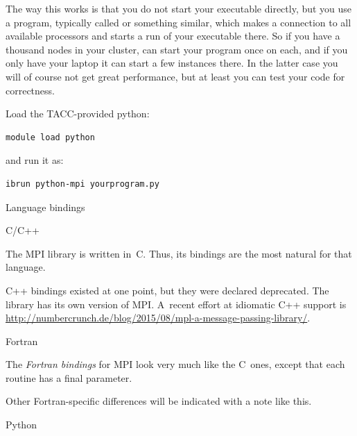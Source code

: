 The way this works is that you do not start your executable directly,
but you use a program, typically called  or
something similar, which makes a connection to all available
processors and starts a run of your executable there. So if you have a
thousand nodes in your cluster,  can start your program once
on each, and if you only have your laptop it can start a few instances
there. In the latter case you will of course not get great
performance, but at least you can test your code for correctness.

\begin{tacc}
  \begin{pythonnote}
    Load the TACC-provided python:
\begin{verbatim}
module load python
\end{verbatim}
and run it as:
\begin{verbatim}
ibrun python-mpi yourprogram.py
\end{verbatim}
  \end{pythonnote}
\end{tacc}

 {Language bindings}

 {C/C++}

The MPI library is written in~C. Thus, its bindings are the most natural
for that language.

C++ bindings existed at one point, but they were declared deprecated.
The  library has its own version of MPI.  A~recent
effort at idiomatic C++ support is 
\url{http://numbercrunch.de/blog/2015/08/mpl-a-message-passing-library/}.


 {Fortran}


The \emph{Fortran bindings} for MPI look very much like the C~ones, except that
each routine has a final  parameter.

\begin{fortrannote}
  Other Fortran-specific differences will be indicated with a note
  like this.
\end{fortrannote}


 {Python}
\label{sec:python-bind}

